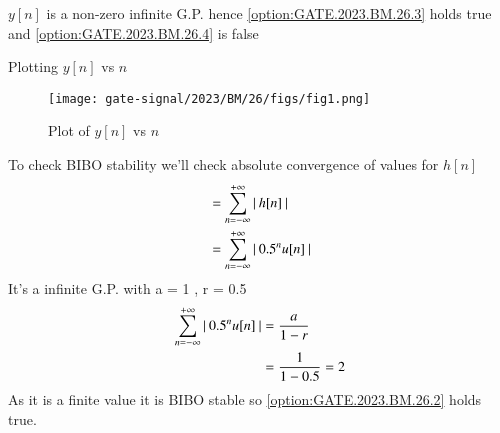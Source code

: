 \documentclass[journal,12pt,twocolumn]{IEEEtran}
\begin{document}
$y[n]$ is a non-zero infinite G.P. hence \ref{option:GATE.2023.BM.26.3} holds true and \ref{option:GATE.2023.BM.26.4} is false

\pagebreak
Plotting $y[n]$ vs $n$
\begin{figure}[h]
    \texttt{[image: gate-signal/2023/BM/26/figs/fig1.png]}
    \caption{Plot of $y[n]$ vs $n$}
    \label{fig:GATE.2023.BM.26.1}
\end{figure}


To check BIBO stability we'll check absolute convergence of values for $h[n]$
\begin{align}
&= \sum^{+\infty}_{n = -\infty}\left\vert\:h[n]\:\right\vert \\
&= \sum^{+\infty}_{n = -\infty}\left\vert\:0.5^nu[n]\:\right\vert
\end{align}
It's a infinite G.P. with a = 1 , r = 0.5
\begin{align}
\sum^{+\infty}_{n = -\infty}\left\vert\:0.5^nu[n]\:\right\vert &= \frac{a}{1 -r} \\
&= \frac{1}{1 - 0.5} = 2
\end{align}
As it is a finite value it is BIBO stable so \ref{option:GATE.2023.BM.26.2} holds true.









\end{document}
